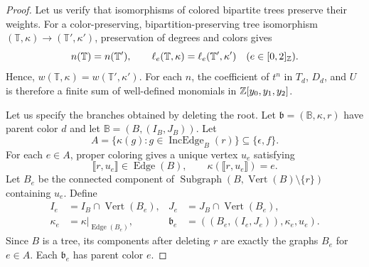 \begin{proof}
Let us verify that isomorphisms of colored bipartite trees preserve their weights.
For a color-preserving, bipartition-preserving tree isomorphism
$(\mathbb T,\kappa)\to(\mathbb T',\kappa')$, preservation of degrees and colors gives
\[
 n(\mathbb T)=n(\mathbb T'),\qquad
 \ell_e(\mathbb T,\kappa)=\ell_e(\mathbb T',\kappa')
 \quad(e\in[0,2]_{\mathbb Z}).
\]
Hence, $w(\mathbb T,\kappa)=w(\mathbb T',\kappa')$.
For each $n$, the coefficient of $t^n$ in $T_d$, $D_d$, and $U$ is therefore a finite sum of well-defined monomials in $\mathbb Z[y_0,y_1,y_2]$.

 Let us specify the branches obtained by deleting the root.
Let $\mathfrak b=(\mathbb B,\kappa,r)$ have parent color $d$ and let $\mathbb B=(B,(I_B,J_B))$.
Let
\[
 A=\{\kappa(g):g\in\operatorname{IncEdge}_B(r)\}
 \subseteq\{\epsilon,f\}.
\]
For each $e\in A$, proper coloring gives a unique vertex $u_e$ satisfying
\[
 \llbracket r,u_e\rrbracket\in\operatorname{Edge}(B),\qquad
 \kappa(\llbracket r,u_e\rrbracket)=e.
\]
Let $B_e$ be the connected component of
$\operatorname{Subgraph}(B,\operatorname{Vert}(B)\setminus\{r\})$ containing $u_e$.
Define
\[
\begin{aligned}
 I_e&=I_B\cap\operatorname{Vert}(B_e),&
 J_e&=J_B\cap\operatorname{Vert}(B_e),\\
 \kappa_e&=\kappa|_{\operatorname{Edge}(B_e)},&
 \mathfrak b_e&=((B_e,(I_e,J_e)),\kappa_e,u_e).
\end{aligned}
\]
Since $B$ is a tree, its components after deleting $r$ are exactly the graphs $B_e$ for $e\in A$.
Each $\mathfrak b_e$ has parent color $e$.


\end{proof}

